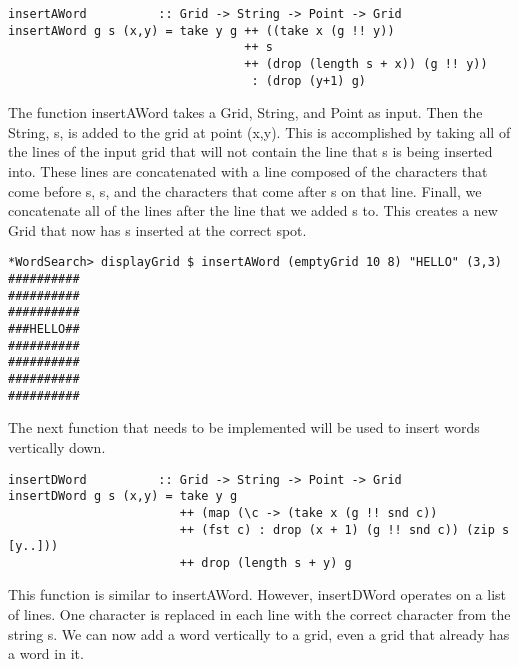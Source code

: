 \documentclass[12pt]{report}   %
\begin{document}
    \vspace{12pt}

    \begin{lstlisting}
insertAWord          :: Grid -> String -> Point -> Grid
insertAWord g s (x,y) = take y g ++ ((take x (g !! y)) 
                                 ++ s 
                                 ++ (drop (length s + x)) (g !! y)) 
                                  : (drop (y+1) g)
    \end{lstlisting}

    \vspace{12pt}

    The function insertAWord takes a Grid, String, and Point as input. Then the
    String, s, is added to the grid at point (x,y). This is accomplished by
    taking all of the lines of the input grid that will not contain the line
    that s is being inserted into. These lines are concatenated with a line
    composed of the characters that come before s, s, and the characters that
    come after s on that line. Finall, we concatenate all of the lines after
    the line that we added s to. This creates a new Grid that now has s
    inserted at the correct spot.

    \vspace{12pt}

\begin{lstlisting}
*WordSearch> displayGrid $ insertAWord (emptyGrid 10 8) "HELLO" (3,3)
##########
##########
##########
###HELLO##
##########
##########
##########
##########
    \end{lstlisting}

    \vspace{12pt}

    The next function that needs to be implemented will be used to insert words
    vertically down.

    \vspace{12pt}
    \pagebreak

    \begin{lstlisting}
insertDWord          :: Grid -> String -> Point -> Grid
insertDWord g s (x,y) = take y g 
                        ++ (map (\c -> (take x (g !! snd c)) 
                        ++ (fst c) : drop (x + 1) (g !! snd c)) (zip s [y..])) 
                        ++ drop (length s + y) g
    \end{lstlisting}

    \vspace{12pt}

    This function is similar to insertAWord. However, insertDWord operates on a
    list of lines. One character is replaced in each line with the correct 
    character from the string s. We can now add a word vertically to a grid, 
    even a grid that already has a word in it.
\end{document}
